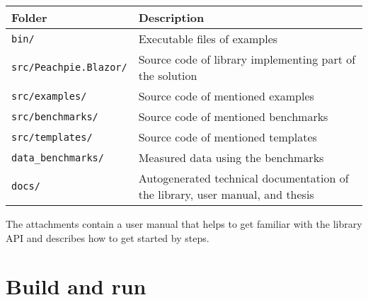 \documentclass[12pt,a4paper]{report}
\begin{document}
\begin{table}[H]
\centering
\begin{tabular}{ | m{11em} | m{22em}| } 
\hline
Folder & Description \\
\hline
\texttt{bin/} & Executable files of examples \\
\texttt{src/Peachpie.Blazor/} & Source code of library implementing part of the solution \\
\texttt{src/examples/} & Source code of mentioned examples \\
\texttt{src/benchmarks/} & Source code of mentioned benchmarks \\
\texttt{src/templates/} & Source code of mentioned templates \\
\texttt{data\_benchmarks/} & Measured data using the benchmarks \\
\texttt{docs/} & Autogenerated technical documentation of the library, user manual, and thesis \\
\hline
\end{tabular}
\end{table}

The attachments contain a user manual that helps to get familiar with the library API and describes how to get started by steps.

\section{Build and run}
\end{document}
